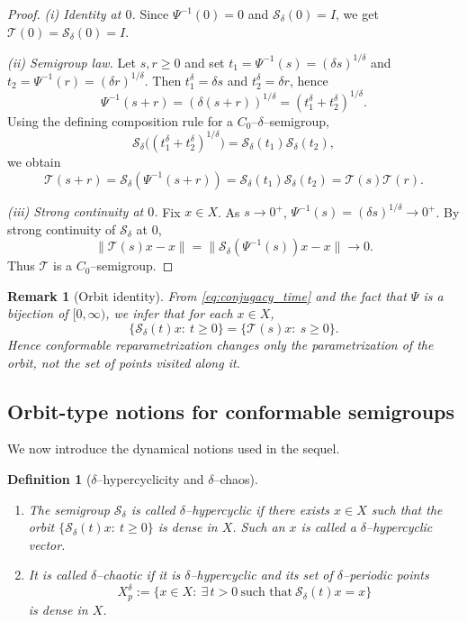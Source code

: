 \documentclass[preprint,12pt]{elsarticle}
\newtheorem{definition}{Definition}
\newtheorem{remark}{Remark}
\newtheorem{proof}{Proof}
\begin{document}
\begin{proof}
\emph{(i) Identity at $0$.}
Since $\Psi^{-1}(0)=0$ and $\mathcal S_\delta(0)=I$, we get
$\mathcal T(0)=\mathcal S_\delta(0)=I$.

\smallskip
\emph{(ii) Semigroup law.}
Let $s,r\ge0$ and set $t_1=\Psi^{-1}(s)=(\delta s)^{1/\delta}$ and
$t_2=\Psi^{-1}(r)=(\delta r)^{1/\delta}$.
Then $t_1^\delta=\delta s$ and $t_2^\delta=\delta r$, hence
\[
\Psi^{-1}(s+r)=(\delta(s+r))^{1/\delta}=(t_1^\delta+t_2^\delta)^{1/\delta}.
\]
Using the defining composition rule for a $C_0$--$\delta$--semigroup,
\[
\mathcal S_\delta\!\bigl((t_1^\delta+t_2^\delta)^{1/\delta}\bigr)
=\mathcal S_\delta(t_1)\mathcal S_\delta(t_2),
\]
we obtain
\[
\mathcal T(s+r)
=\mathcal S_\delta(\Psi^{-1}(s+r))
=\mathcal S_\delta(t_1)\mathcal S_\delta(t_2)
=\mathcal T(s)\mathcal T(r).
\]

\smallskip
\emph{(iii) Strong continuity at $0$.}
Fix $x\in X$.
As $s\to0^+$, $\Psi^{-1}(s)=(\delta s)^{1/\delta}\to0^+$.
By strong continuity of $\mathcal S_\delta$ at $0$,
\[
\|\mathcal T(s)x-x\|
=
\|\mathcal S_\delta(\Psi^{-1}(s))x-x\|
\longrightarrow 0.
\]
Thus $\mathcal T$ is a $C_0$--semigroup.
\end{proof}

\begin{remark}[Orbit identity]\label{rem:orbit_identity}
From \eqref{eq:conjugacy_time} and the fact that $\Psi$ is a bijection of $[0,\infty)$,
we infer that for each $x\in X$,
\[
\{\mathcal S_\delta(t)x:\ t\ge0\}
=
\{\mathcal T(s)x:\ s\ge0\}.
\]
Hence conformable reparametrization changes only the parametrization of the orbit,
not the set of points visited along it.
\end{remark}

\subsection{Orbit-type notions for conformable semigroups}

We now introduce the dynamical notions used in the sequel.

\begin{definition}[$\delta$--hypercyclicity and $\delta$--chaos]\label{def:delta_hc_chaos}
\leavevmode
\begin{enumerate}
\item
The semigroup $\mathcal S_\delta$ is called \emph{$\delta$--hypercyclic} if there exists
$x\in X$ such that the orbit $\{\mathcal S_\delta(t)x:\ t\ge0\}$ is dense in $X$.
Such an $x$ is called a $\delta$--hypercyclic vector.

\item
It is called \emph{$\delta$--chaotic} if it is $\delta$--hypercyclic and its set of
$\delta$--periodic points
\[
X_p^\delta
:=
\{x\in X:\ \exists\,t>0\ \text{such that}\ \mathcal S_\delta(t)x=x\}
\]
is dense in $X$.
\end{enumerate}
\end{definition}
\end{document}
